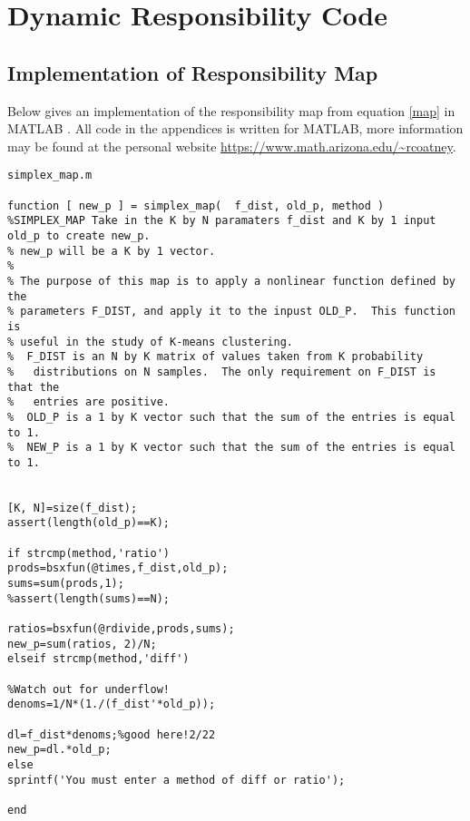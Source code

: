 \renewcommand{\thesubsection}{\Alph{subsection}}

\chapter{Dynamic Responsibility Code}\label{app:DRcode}
\section{Implementation of Responsibility Map}\label{code:map}
Below gives an implementation of the responsibility map from equation \eqref{map} in MATLAB \cite{MATLAB:2020a}. All code in the appendices is written for MATLAB, more information may be found at the personal website \url{https://www.math.arizona.edu/~rcoatney}.
\begin{verbatim}
simplex_map.m

function [ new_p ] = simplex_map(  f_dist, old_p, method )
%SIMPLEX_MAP Take in the K by N paramaters f_dist and K by 1 input old_p to create new_p.
% new_p will be a K by 1 vector.
%
% The purpose of this map is to apply a nonlinear function defined by the
% parameters F_DIST, and apply it to the inpust OLD_P.  This function is
% useful in the study of K-means clustering.
%  F_DIST is an N by K matrix of values taken from K probability
%   distributions on N samples.  The only requirement on F_DIST is that the
%   entries are positive.
%  OLD_P is a 1 by K vector such that the sum of the entries is equal to 1.
%  NEW_P is a 1 by K vector such that the sum of the entries is equal to 1.


[K, N]=size(f_dist);
assert(length(old_p)==K);

if strcmp(method,'ratio')
prods=bsxfun(@times,f_dist,old_p);
sums=sum(prods,1);
%assert(length(sums)==N);

ratios=bsxfun(@rdivide,prods,sums);
new_p=sum(ratios, 2)/N;
elseif strcmp(method,'diff')

%Watch out for underflow!
denoms=1/N*(1./(f_dist'*old_p));

dl=f_dist*denoms;%good here!2/22
new_p=dl.*old_p;
else
sprintf('You must enter a method of diff or ratio');

end

\end{verbatim}

